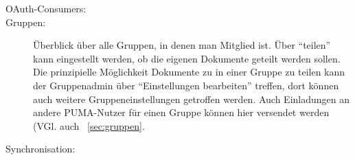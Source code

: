 \begin{description}
   \item[OAuth-Consumers:]
   \item[Gruppen:]
Überblick über alle Gruppen, in denen man Mitglied ist. Über \enquote{teilen} kann eingestellt werden, ob die eigenen Dokumente geteilt werden sollen. Die prinzipielle Möglichkeit Dokumente zu in einer Gruppe zu teilen kann der Gruppenadmin über \enquote{Einstellungen bearbeiten} treffen, dort können auch weitere Gruppeneinstellungen getroffen werden. Auch Einladungen an andere PUMA-Nutzer für einen Gruppe können hier versendet werden (VGl. auch ~\autoref{sec:gruppen}.  
   \item[Synchronisation:]
\end{description}
